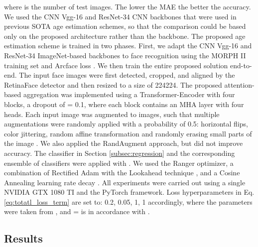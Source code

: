 \documentclass[10pt,journal]{IEEEtran}\usepackage{amsfonts}
\begin{document}
where  is the number of test images. The lower the MAE the better the
accuracy. We used the CNN Vgg-16 \cite{vgg} and ResNet-34 \cite{7780459} CNN
backbones that were used in previous SOTA age estimation schemes, so that the
comparison could be based only on the proposed architecture rather than the
backbone. The proposed age estimation scheme is trained in two phases. First,
we adapt the CNN Vgg-16 \cite{vgg} and ResNet-34 \cite{7780459} ImageNet-based
backbones to face recognition using the MORPH II \cite{1613043} training set
and Arcface loss \cite{8953658}. We then train the entire proposed solution
end-to-end. The input face images were first detected, cropped, and aligned by
the RetinaFace detector \cite{RetinaFace} and then resized to a size of
224224. The proposed attention-based aggregation was implemented using
a Transformer-Encoder with four blocks, a dropout of  = 0.1, where
each block contains an MHA layer with four heads. Each input image was
augmented to \thinspace images, such that multiple
augmentations were randomly applied with a probability of 0.5: horizontal
flips, color jittering, random affine transformation and randomly erasing
small parts of the image \cite{8954382}. We also applied the RandAugment
\cite{Randaugment} approach, but did not improve accuracy. The classifier in
Section \ref{subsec:regression} and the corresponding ensemble of classifiers
 were
applied with . We used the Ranger optimizer, a combination of
Rectified Adam \cite{Liu2020OnTV} with the Lookahead technique
\cite{Lookahead}, and a Cosine Annealing learning rate decay \cite{SGDR}. All
experiments were carried out using a single NVIDIA GTX 1080 TI and the PyTorch
framework. Loss hyperparameters  in Eq. \ref{eq:totatl_loss_term}
are set to: {0.2, 0.05, 1, 1} accordingly, where the parameters  were taken from \cite{Mean-Variance}, and
= is in accordance with .

\subsection{Results}

\label{subsec:results}
\end{document}
